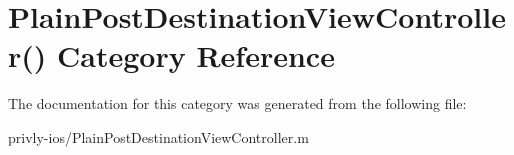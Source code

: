 \hypertarget{category_plain_post_destination_view_controller_07_08}{\section{Plain\-Post\-Destination\-View\-Controller() Category Reference}
\label{category_plain_post_destination_view_controller_07_08}
}


The documentation for this category was generated from the following file\-:\begin{DoxyCompactItemize}
\item 
privly-\/ios/Plain\-Post\-Destination\-View\-Controller.\-m\end{DoxyCompactItemize}
